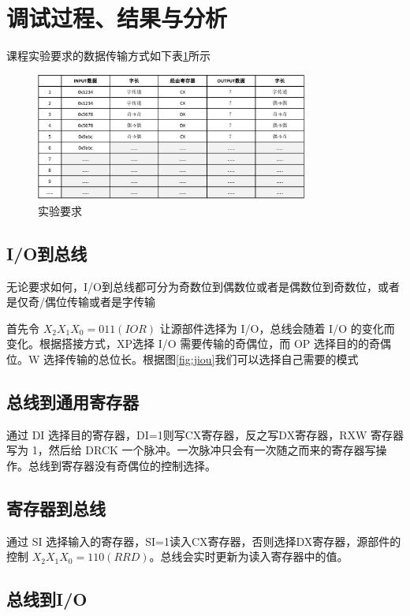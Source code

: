 \documentclass[a4paper,10pt,UTF8]{paper}
\numberwithin{equation}{section}
\numberwithin{figure}{section}
\begin{document}
\section{调试过程、结果与分析}

课程实验要求的数据传输方式如下表\ref{fig:yaoqiu}所示

\begin{figure}[h]
    \centering
    \includegraphics[width=0.8\textwidth]{yaoqiu.PNG}
    \caption{实验要求}
    \label{fig:yaoqiu}
\end{figure}

\subsection{I/O到总线}

无论要求如何，I/O到总线都可分为奇数位到偶数位或者是偶数位到奇数位，或者是仅奇/偶位传输或者是字传输

首先令 $X_2X_1X_0 = 011(IOR)$ 让源部件选择为 I/O，总线会随着 I/O 的变化而变化。根据搭接方式，XP选择 I/O 需要传输的奇偶位，而 OP 选择目的的奇偶位。W 选择传输的总位长。根据图\ref{fig:jiou}我们可以选择自己需要的模式

\subsection{总线到通用寄存器}

通过 DI 选择目的寄存器，DI=1则写CX寄存器，反之写DX寄存器，RXW 寄存器写为 1，然后给 DRCK 一个脉冲。一次脉冲只会有一次随之而来的寄存器写操作。总线到寄存器没有奇偶位的控制选择。

\subsection{寄存器到总线}

通过 SI 选择输入的寄存器，SI=1读入CX寄存器，否则选择DX寄存器，源部件的控制 $X_2X_1X_0 = 110(RRD)$。总线会实时更新为读入寄存器中的值。

\subsection{总线到I/O}
\end{document}
